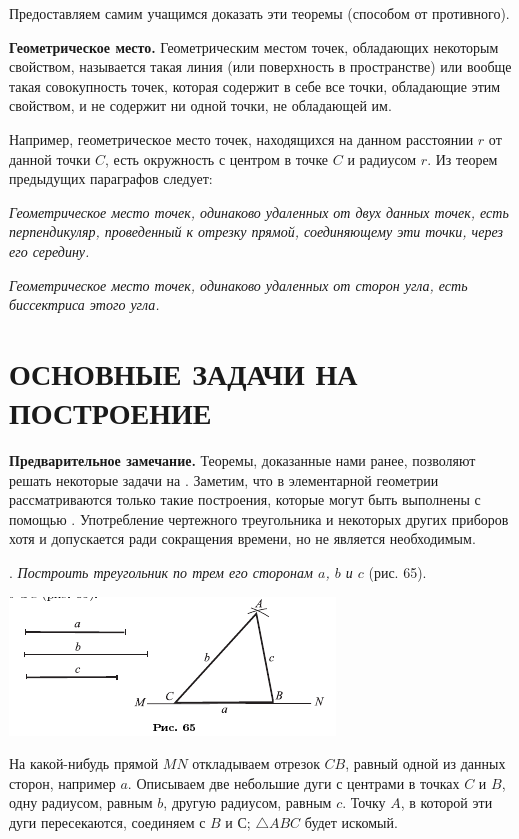 \documentclass[oneside]{book}
\begin{document}
\medskip

Предоставляем самим учащимся доказать эти теоремы (способом от противного).

\textbf{Геометрическое место.}
Геометрическим местом точек, обладающих некоторым свойством, называется такая линия (или поверхность в пространстве) или вообще такая совокупность точек, которая содержит в себе все точки, обладающие этим свойством, и не содержит ни одной точки, не обладающей им.

Например, геометрическое место точек, находящихся на данном расстоянии $r$ от данной точки $C$, есть окружность с центром в точке $C$ и радиусом $r$.
Из теорем предыдущих параграфов следует:

\emph{Геометрическое место точек, одинаково удаленных от двух данных точек, есть перпендикуляр, проведенный к отрезку прямой, соединяющему эти точки, через его середину.}

\emph{Геометрическое место точек, одинаково удаленных от сторон угла, есть биссектриса этого угла.}

\section{ОСНОВНЫЕ ЗАДАЧИ НА ПОСТРОЕНИЕ}

\textbf{Предварительное замечание.}
Теоремы, доказанные нами ранее, позволяют решать некоторые задачи на .
Заметим, что в элементарной геометрии рассматриваются только такие построения, которые могут быть выполнены с помощью .
Употребление чертежного треугольника и некоторых других приборов хотя и допускается ради сокращения времени, но не является необходимым.

.
\emph{Построить треугольник по трем его сторонам $a$, $b$ и $c$} (рис. 65).

\includegraphics{pics/ris-65}

На какой-нибудь прямой $MN$ откладываем отрезок $CB$, равный одной из данных сторон, например $a$.
Описываем две небольшие дуги с центрами в точках $C$ и $B$, одну радиусом, равным $b$, другую радиусом, равным $c$.
Точку $A$, в которой эти дуги пересекаются, соединяем с $B$ и С;
$\triangle ABC$ будет искомый.
\end{document}
